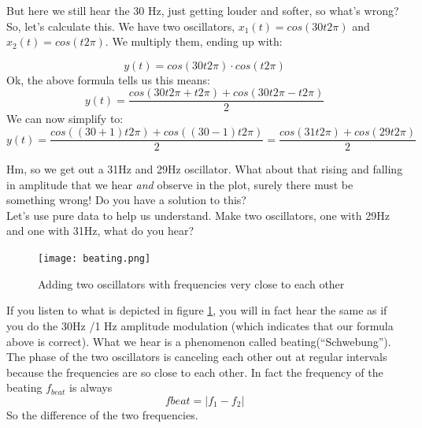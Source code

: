 But here we still hear the 30 Hz, just getting louder and softer, so what's wrong?\\
So, let's calculate this. We have two oscillators, $x_1(t) = cos(30t2\pi)$ and $x_2(t)=cos(t2\pi)$. We multiply them, ending up with:

\begin{equation}
	y(t) = cos(30t2\pi) \cdot cos(t2\pi)
\end{equation}
Ok, the above formula tells us this means:
\begin{equation}
	y(t) = \frac{cos(30t2\pi+t2\pi)+cos(30t2\pi-t2\pi)}{2}
\end{equation}
We can now simplify to:
\begin{equation}
	y(t) = \frac{cos((30+1)t2\pi)+cos((30-1)t2\pi)}{2} = \frac{cos(31t2\pi)+cos(29t2\pi)}{2}
\end{equation}

Hm, so we get out a 31Hz and 29Hz oscillator. What about that rising and falling in amplitude that we hear \textit{and} observe in the plot, surely there must be something wrong! Do you have a solution to this?\\

Let's use pure data to help us understand. Make two oscillators, one with 29Hz and one with 31Hz, what do you hear?

\begin{figure}[h!]
	\centering
	\texttt{[image: beating.png]}
	\caption[adding two oscillators]
	{Adding two oscillators with frequencies very close to each other}
	\label{fig:beating}
\end{figure}

If you listen to what is depicted in figure \ref{fig:beating}, you will in fact hear the same as if you do the 30Hz /1 Hz amplitude modulation (which indicates that our formula above is correct). What we hear is a phenomenon called beating(``Schwebung''). The phase of the two oscillators is canceling each other out at regular intervals because the frequencies are so close to each other. In fact the frequency of the beating $f_{beat}$ is always
\begin{equation}
	f{beat}=|f_1-f_2|
\end{equation}
So the difference of the two frequencies.


